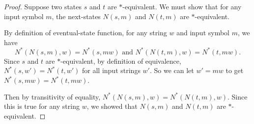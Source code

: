 \documentclass[14pt]{extarticle}
\begin{document}
\begin{proof}
    Suppose two states \(s\) and \(t\) are \(*\)-equivalent. We must show that for any input symbol \(m\), the next-states
    \(N(s, m)\) and \(N(t, m)\) are \(*\)-equivalent.

    By definition of eventual-state function, for any string \(w\) and input symbol \(m\), we have
    \[
        N^*(N(s, m), w) = N^*(s, mw) \text{ and } N^*(N(t, m), w) = N^*(t, mw).
    \]
    Since \(s\) and \(t\) are \(*\)-equivalent, by definition of equivalence, \(N^*(s, w') = N^*(t, w')\) for all input strings
    \(w'\). So we can let \(w' = mw\) to get \(N^*(s, mw) = N^*(t, mw)\).

    Then by transitivity of equality, \(N^*(N(s, m), w) = N^*(N(t, m), w)\). Since this is true for any string \(w\), we showed
    that \(N(s, m)\) and \(N(t, m)\) are \(*\)-equivalent.
\end{proof}
\end{document}

